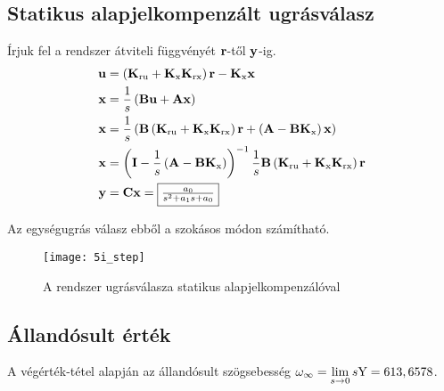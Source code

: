 
\subsection{Statikus alapjelkompenzált ugrásválasz}

Írjuk fel a rendszer átviteli függvényét $\B{r}$-től $\B{y}$-ig.
\begin{align}
	\B{u} &= \brc{\B{K}_\text{ru}+\B{K}_\text{x}\B{K}_\text{rx}}\B{r} - \B{K}_\text{x}\B{x}\\
	\B{x} &= \frac{1}{s}\brc{\B{B}\B{u} + \B{A}\B{x}}\\
	\B{x} &= \frac{1}{s}\brc{\B{B}\brc{\B{K}_\text{ru}+\B{K}_\text{x}\B{K}_\text{rx}}\B{r}+\brc{\B{A}-\B{B}\B{K}_\text{x}}\B{x}}\\
	\B{x} &= \brc{\B{I}-\frac{1}{s}\brc{\B{A}-\B{B}\B{K}_\text{x} }}^{-1}\frac{1}{s}\B{B}\brc{\B{K}_\text{ru}+\B{K}_\text{x}\B{K}_\text{rx}}\B{r}\\
	\B{y} &= \B{C}\B{x} = \fbox{$\frac{a_0}{s^2 + a_1 s + a_0}$}
\end{align}

Az egységugrás válasz ebből a szokásos módon számítható.
\begin{figure}[H]
	\centering
	\texttt{[image: 5i\_step]}
	\caption{A rendszer ugrásválasza statikus alapjelkompenzálóval}
	\label{fig:5i_step}
\end{figure}


\subsection{Állandósult érték}

A végérték-tétel alapján az állandósult szögsebesség $\omega_\infty = \lim\limits_{s\rightarrow 0}s\fn{Y} = 613,6578$.

